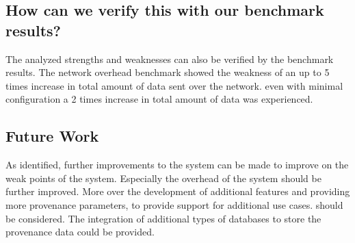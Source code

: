 \subsection{How can we verify this with our benchmark results?}
The analyzed strengths and weaknesses can also be verified by the benchmark results. The network overhead benchmark showed the weakness of an up to 5 times increase in total amount of data sent over the network. even with minimal configuration a 2 times increase in total amount of data was experienced.  


\subsection{Future Work}
As identified, further improvements to the system can be made to improve on the weak points of the system. Especially the overhead of the system should be further improved. More over the development of additional features and providing more provenance parameters, to provide support for additional use cases. should be considered. The integration of additional types of databases to store the provenance data could be provided. 


